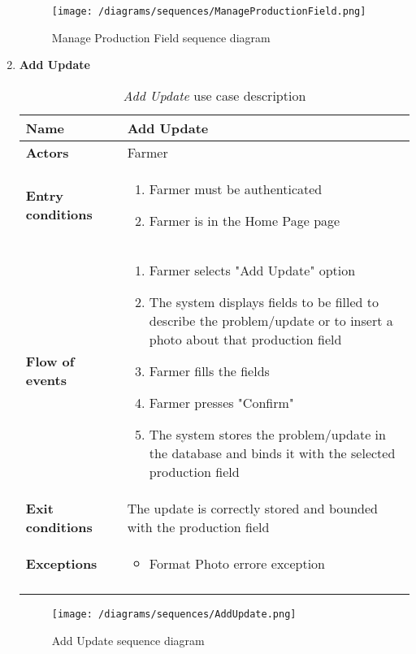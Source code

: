\begin{enumerate}
				\begin{figure}[h]
					\centering
					\texttt{[image: /diagrams/sequences/ManageProductionField.png]}
					\caption{Manage Production Field sequence diagram}
				\end{figure}
			
				\FloatBarrier
				\newpage
			\item \textbf{Add Update}
				\begin{longtable}{p{0.26\linewidth}p{0.75\linewidth}}
					\toprule
					\textbf{Name} & \textbf{Add Update} \\
					\midrule
					\textbf{Actors} & Farmer \\
					\midrule
					\textbf{Entry conditions} & \begin{enumerate}
													\item Farmer must be authenticated
													\item Farmer is in the Home Page page
												\end{enumerate} \\
					\midrule
					\textbf{Flow of events} & 
					\begin{enumerate}
						\item Farmer selects "Add Update" option
						\item The system displays fields to be filled to describe the problem/update or to insert a photo about that production field
						\item Farmer fills the fields
						\item Farmer presses "Confirm"
						\item The system stores the problem/update in the database and binds it with the selected production field
					\end{enumerate} \\
					\midrule
					\textbf{Exit conditions} & The update is correctly stored and bounded with the production field\\
					\midrule
					\textbf{Exceptions} & 
					\begin{itemize}
						\item Format Photo errore exception	
					\end{itemize} \\
					\bottomrule
					\caption{\emph{Add Update} use case description}
				\end{longtable}
			
				\begin{figure}[h]
					\centering
					\texttt{[image: /diagrams/sequences/AddUpdate.png]}
					\caption{Add Update sequence diagram}
				\end{figure}
			

\end{enumerate}
